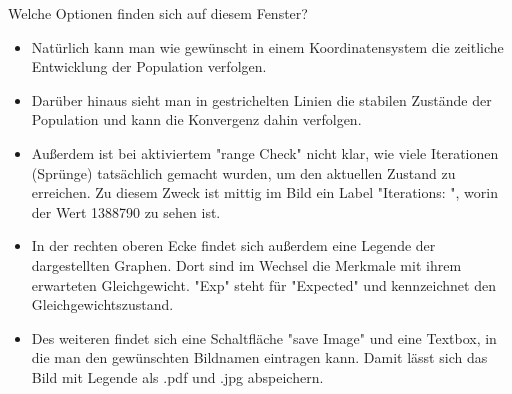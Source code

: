 \documentclass[11pt, a4paper, german]{article}
\theoremstyle{plain}
\begin{document}
	Welche Optionen finden sich auf diesem Fenster?\\
	\begin{itemize}
		\item Natürlich kann man wie gewünscht in einem Koordinatensystem die zeitliche Entwicklung der Population verfolgen.
		\item Darüber hinaus sieht man in gestrichelten Linien die stabilen Zustände der Population und kann die Konvergenz dahin verfolgen.
		\item Außerdem ist bei aktiviertem "{}range Check"{} nicht klar, wie viele Iterationen (Sprünge) tatsächlich gemacht wurden, um den aktuellen Zustand zu erreichen. Zu diesem Zweck ist mittig im Bild ein Label "{}Iterations: "{}, worin der Wert 1388790 zu sehen ist.
		\item In der rechten oberen Ecke findet sich außerdem eine Legende der dargestellten Graphen. Dort sind im Wechsel die Merkmale mit ihrem erwarteten Gleichgewicht. "{}Exp"{} steht für "{}Expected"{} und kennzeichnet den Gleichgewichtszustand.
		\item Des weiteren findet sich eine Schaltfläche "{}save Image"{} und eine Textbox, in die man den gewünschten Bildnamen eintragen kann. Damit lässt sich das Bild mit Legende als .pdf und .jpg abspeichern.
	\end{itemize}
\end{document}

